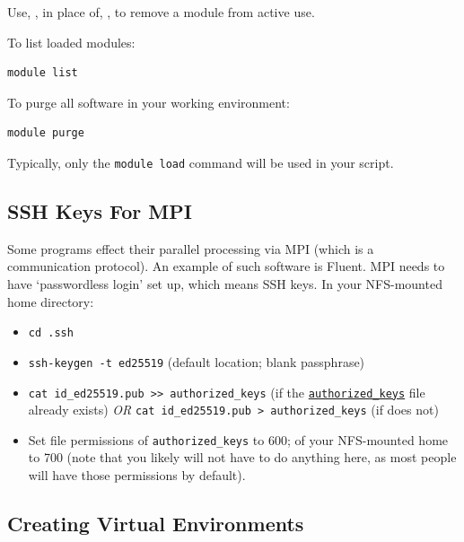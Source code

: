 \documentclass{easychair}
\begin{document}
Use, , in place of, , to remove a module from active use.

To list loaded modules:

\begin{verbatim}
module list
\end{verbatim}

To purge all software in your working environment:

\begin{verbatim}
module purge
\end{verbatim}

Typically, only the \texttt{module load} command will be used in your script.



\subsection{SSH Keys For MPI}
\label{sect:ssh-mpi}

Some programs effect their parallel processing via MPI (which is a 
communication protocol). An example of such software is Fluent. MPI needs to 
have `passwordless login' set up, which means SSH keys. In your NFS-mounted 
home directory:

\begin{itemize}
\item
\texttt{cd .ssh}
\item
\texttt{ssh-keygen -t ed25519} (default location; blank passphrase) 
\item
\texttt{cat id\_ed25519.pub >> authorized\_keys} (if the \texttt{\href{https://www.ssh.com/academy/ssh/authorized-keys-file}{authorized\_keys}}
file already exists) \emph{OR} \texttt{cat id\_ed25519.pub > authorized\_keys} (if does not) 
\item
Set file permissions of \texttt{authorized\_keys} to 600; of your NFS-mounted home
to 700 (note that you likely will not have to do anything here, as most people
will have those permissions by default). 
\end{itemize}

\subsection{Creating Virtual Environments}
\label{sect:environments}
\end{document}
